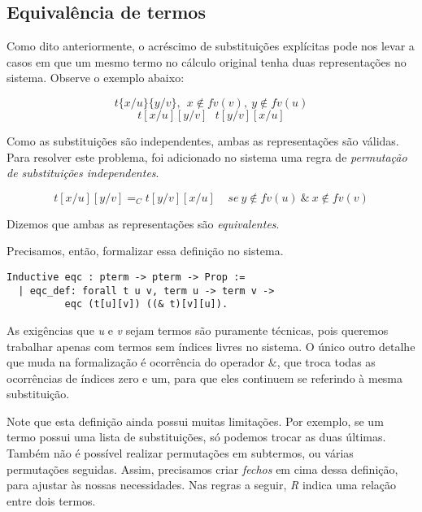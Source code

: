\subsection{Equivalência de termos}
\label{sub:equival_ncia_de_termos}

Como dito anteriormente, o acréscimo de substituições explícitas pode nos levar
a casos em que um mesmo termo no cálculo original tenha duas representações no
sistema. Observe o exemplo abaixo:

\[ t\{x/u\}\{y/v\},\ \ x \notin fv(v),\ y \notin fv(u) \]
\[ t[x/u][y/v]\ \ \ t[y/v][x/u]\]

Como as substituições são independentes, ambas as representações são válidas.
Para resolver este problema, foi adicionado no sistema uma regra de
\emph{permutação de substituições independentes}.

\[ t[x/u][y/v] =_C t[y/v][x/u] \ \ \ \ \ se\ y \notin fv(u)\ \&\ x \notin fv(v)\] 

Dizemos que ambas as representações são \emph{equivalentes}.

Precisamos, então, formalizar essa definição no sistema.

\begin{lstlisting}[basicstyle=\small]
Inductive eqc : pterm -> pterm -> Prop := 
  | eqc_def: forall t u v, term u -> term v -> 
          eqc (t[u][v]) ((& t)[v][u]).
\end{lstlisting}

As exigências que \emph{u} e \emph{v} sejam termos são puramente técnicas, pois
queremos trabalhar apenas com termos sem índices livres no sistema. O único
outro detalhe que muda na formalização é ocorrência do operador $\&$, que
troca todas as ocorrências de índices zero e um, para que eles continuem se
referindo à mesma substituição.

Note que esta definição ainda possui muitas limitações. Por exemplo, se um termo
possui uma lista de substituições, só podemos trocar as duas últimas. Também não
é possível realizar permutações em subtermos, ou várias permutações seguidas.
Assim, precisamos criar \emph{fechos} em cima dessa definição, para ajustar às
nossas necessidades. Nas regras a seguir, \emph{R} indica uma relação entre dois
termos. 

